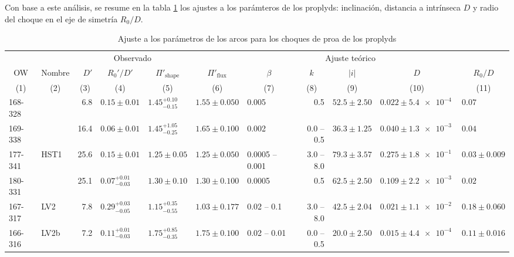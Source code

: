 Con base a este análisis, se resume en la tabla \ref{tab:arc-fits} los ajustes a los parámteros de los proplyds: inclinación, distancia a \thC{} intrínseca $D$ y radio del choque en el eje de simetría $R_0/D$.
\begin{landscape}
\begin{table}
  \caption{Ajuste a los parámetros de los arcos para los choques de proa de los proplyds}
  \label{tab:arc-fits} 
  \newcommand\C[1]{\multicolumn{1}{c}{#1}}
  \begin{adjustbox}{width=1.35\textwidth}
    \small
\begin{tabular}{llrllllrlll}\toprule
             &          & \multicolumn{3}{c}{\dotfill Observado \dotfill}              & \multicolumn{6}{c}{\dotfill Ajuste teórico \dotfill} \\ 
  \C{OW}     & \C{Nombre} & \(D'\) &\C{ \(R_0'/D'\) }&\C{ \(\Pi'_{\mathrm{shape}}\) }&\C{ \(\Pi'_{\mathrm{flux}}\) }&\C{ \(\beta\) }&\C{ \(k\) }&\C{ \(|i|\) }&\C{ \(D\) }&\C{ \(R_0/D\)}\\
  \C{(1)}& \C{ (2) }&\C{ (3)    }&\C{    (4)      }&\C{              (5)           }&\C{           (6)             }&\C{     (7)   }&\C{   (8)   }&\C{   (9) }&\C{  (10) }&\C{   (11)} \\
\midrule     
 168-328  &            &    6.8  &  $0.15 \pm 0.01$  &  $1.45^{+0.10}_ {-0.15}$   &  $1.55 \pm 0.050$     &  0.005  &  0.5  &  $52.5 \pm 2.50$   &  $0.022 \pm \SI{5.4e-4}{}$  &  $0.07$  \\
 169-338  &            &  16.4  &  $0.06 \pm 0.01$  &  $1.45^{+1.05}_{-0.25}$   &  $1.65 \pm 0.100$     &  0.002  &  0.0 -- 0.5  &  $36.3 \pm 1.25$   &  $0.040 \pm \SI{1.3e-3}{}$  &  $0.04$  \\
 177-341  & HST1   & 25.6  &  $0.15 \pm 0.01$  &  $1.25 \pm 0.05$   &  $1.25 \pm 0.050$     &  0.0005 -- 0.001  &  3.0 -- 8.0  &  $79.3 \pm 3.57$   &  $0.275 \pm \SI{1.8e-1}{}$  &  $0.03 \pm 0.009$  \\
 180-331  &             &  25.1  &  $0.07^{+0.01}_{-0.03}$  &  $1.30 \pm 0.10$   &  $1.30 \pm 0.100$     &  0.0005  &  0.5  &  $62.5 \pm 2.50$   &  $0.109 \pm \SI{2.2e-3}{}$  &  $0.02$  \\
 167-317  &  LV2     &    7.8  &  $0.29^{+0.03}_{-0.05}$  &  $1.15^{+0.35}_{-0.55}$   &  $1.03 \pm 0.177$      &  0.02 -- 0.1  &  3.0 -- 8.0  &  $42.5 \pm 2.04$  &  $0.021 \pm \SI{1.1e-2}{}$  &  $0.18 \pm 0.060$  \\
 166-316  & LV2b    &   7.2  &  $0.11^{+0.01}_{-0.03}$  &  $1.75^{+0.85}_{-0.35}$   &  $1.75 \pm 0.100$     &  0.02 -- 0.01  &  0.0 -- 0.5  &  $20.0 \pm 2.50$  &  $0.015 \pm \SI{4.4e-4}{}$  &  $0.11 \pm 0.016$  \\

\end{tabular}
\end{adjustbox}
\end{table}
\end{landscape}
